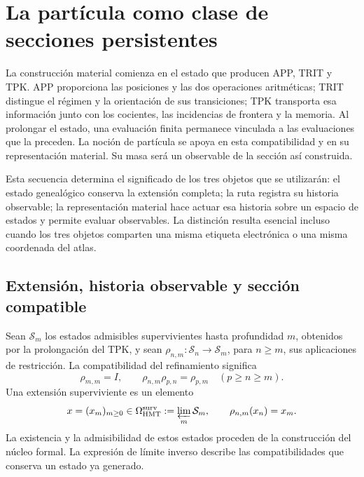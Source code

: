 \section{La partícula como clase de secciones persistentes}
\label{vi:sec:particula}

La construcción material comienza en el estado que producen APP, TRIT y
TPK. APP proporciona las posiciones y las dos operaciones aritméticas;
TRIT distingue el régimen y la orientación de sus transiciones; TPK
transporta esa información junto con los cocientes, las incidencias de
frontera y la memoria. Al prolongar el estado, una evaluación finita
permanece vinculada a las evaluaciones que la preceden. La noción de
partícula se apoya en esta compatibilidad y en su representación material.
Su masa será un observable de la sección así construida.

Esta secuencia determina el significado de los tres objetos que se
utilizarán: el estado genealógico conserva la extensión completa; la ruta
registra su historia observable; la representación material hace actuar
esa historia sobre un espacio de estados y permite evaluar observables.
La distinción resulta esencial incluso cuando los tres objetos comparten
una misma etiqueta electrónica o una misma coordenada del atlas.

\subsection{Extensión, historia observable y sección compatible}
\label{vi:subsec:extension-persistente}

Sean $\mathcal S_m$ los estados admisibles supervivientes hasta profundidad
$m$, obtenidos por la prolongación del TPK, y sean
$\rho_{n,m}:\mathcal S_n\to\mathcal S_m$, para $n\geq m$, sus
aplicaciones de restricción. La compatibilidad del refinamiento significa
\begin{equation}
 \rho_{m,m}=I,\qquad
 \rho_{n,m}\rho_{p,n}=\rho_{p,m}\quad(p\geq n\geq m).
 \label{vi:eq:sistema-estados}
\end{equation}
Una extensión superviviente es un elemento
\begin{equation}
 x=(x_m)_{m\geq0}\in\Omega^{\mathrm{surv}}_{\mathrm{HMT}}
 :=\varprojlim_m\mathcal S_m,
 \qquad \rho_{n,m}(x_n)=x_m.
 \label{vi:eq:extension-superviviente}
\end{equation}
La existencia y la admisibilidad de estos estados proceden de la
construcción del núcleo formal. La expresión de límite inverso describe
las compatibilidades que conserva un estado ya generado.

